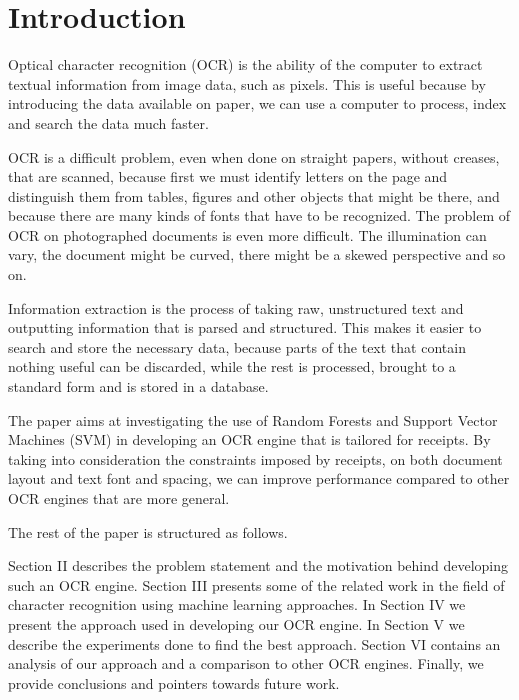 \section{Introduction}
Optical character recognition (OCR) is the ability of the computer to extract textual information from image data, such as pixels. This is useful because by introducing the data available on paper, we can use a computer to process, index and search the data much faster.  

OCR is a difficult problem, even when done on straight papers, without creases, that are scanned, because first we must identify letters on the page and distinguish them from tables, figures and other objects that might be there, and because there are many kinds of fonts that have to be recognized. The problem of OCR on photographed documents is even more difficult. The illumination can vary, the document might be curved, there might be a skewed perspective and so on. 

Information extraction is the process of taking raw, unstructured text and outputting information that is parsed and structured. This makes it easier to search and store the necessary data, because parts of the text that contain nothing useful can be discarded, while the rest is processed, brought to a standard form and is stored in a database. 

The paper aims at investigating the use of Random Forests and Support Vector Machines (SVM) in developing an OCR engine that is tailored for receipts. By taking into consideration the constraints imposed by receipts, on both document layout and text font and spacing, we can improve performance compared to other OCR engines that are more general. 

The rest of the paper is structured as follows.

Section II describes the problem statement and the motivation behind developing such an OCR engine. Section III presents some of the related work in the field of character recognition using machine learning approaches. In Section IV we present the approach used in developing our OCR engine. In Section V we describe the experiments done to find the best approach. Section VI contains an analysis of our approach and a comparison to other OCR engines. Finally, we provide conclusions and pointers towards future work. 
